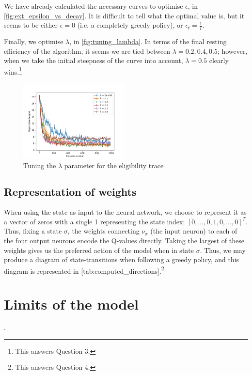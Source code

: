 \documentclass[a4paper, 11pt, twocolumn, final]{article} %
\begin{document}
We have already calculated the necessary curves to optimise $\epsilon$, in
\autoref{fig:ext_epsilon_vs_decay}.  It is difficult to tell what the optimal
value is, but it seems to be either $\epsilon = 0$ (i.e. a completely greedy
policy), or $\epsilon_t = \frac{1}{t}$.

Finally, we optimise $\lambda$, in \autoref{fig:tuning_lambda}.  In terms of the
final resting efficiency of the algorithm, it seems we are tied between $\lambda =
0.2, 0.4, 0.5$; however, when we take the initial steepness of the curve into
account, $\lambda = 0.5$ clearly wins.\footnote{This answers Question 3.}

\begin{figure}
  \includegraphics[width=0.49\textwidth]{figures/tuning_lambda.png}
  \caption{Tuning the $\lambda$ parameter for the eligibility trace}
  \label{fig:tuning_lambda}
\end{figure}

\subsection{Representation of weights} When using the state as input to the
neural network, we choose to represent it as a vector of zeros with a single 1
representing the state index: $[0, \ldots, 0, 1, 0, \ldots, 0]^T$.  Thus, fixing
a state $\sigma$, the weights connecting $\nu_\sigma$ (the input neuron) to each
of the four output neurons encode the Q-values directly.  Taking the largest of
these weights gives us the preferred action of the model when in state $\sigma$.
Thus, we may produce a diagram of state-transitions when following a greedy
policy, and this diagram is represented in
\autoref{tab:computed_directions}.\footnote{This answers Question 4.}

\section{Limits of the model} .



\end{document}
